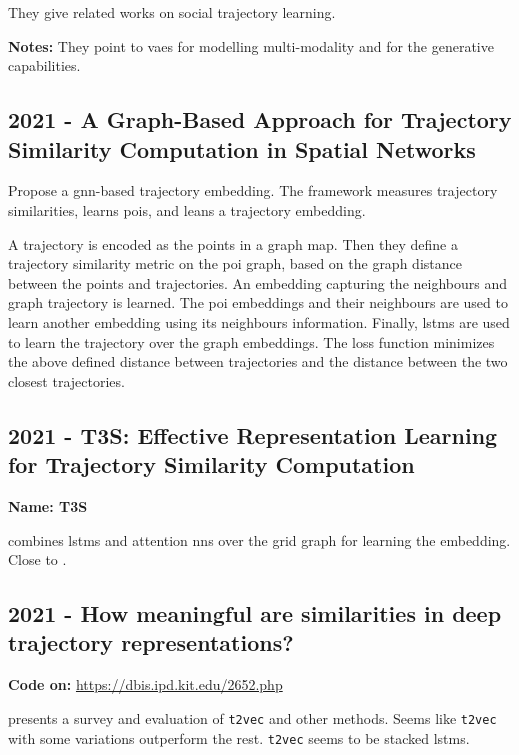They give related works on social trajectory learning.

\textbf{Notes:} They point to \glspl{vae} for modelling multi-modality and for the generative capabilities. 

\subsection*{2021 - A Graph-Based Approach for Trajectory Similarity Computation in Spatial Networks}

\cite{han2021graph} Propose a \gls{gnn}-based trajectory embedding. The framework measures trajectory similarities, learns \glspl{poi}, and leans a trajectory embedding.

A trajectory is encoded as the points in a graph map. Then they define a trajectory similarity metric on the \gls{poi} graph, based on the graph distance between the points and trajectories. An embedding capturing the neighbours and graph trajectory is learned. The \gls{poi} embeddings and their neighbours are used to learn another embedding using its neighbours information. Finally, \glspl{lstm} are used to learn the trajectory over the graph embeddings. The loss function minimizes the above defined distance between trajectories and the distance between the two closest trajectories.

\subsection*{2021 - T3S: Effective Representation Learning for Trajectory Similarity Computation}

\textbf{Name: T3S}

\cite{yang2021t3s} combines \glspl{lstm} and attention \glspl{nn} over the grid graph for learning the embedding. Close to \cite{yao2019computing, zhang2020trajectory, chen2021embedding}.

\subsection*{2021 - How meaningful are similarities in deep trajectory representations?}

\textbf{Code on:} \url{https://dbis.ipd.kit.edu/2652.php}

\cite{taghizadeh2021meaningful} presents a survey and evaluation of \texttt{t2vec} \cite{li2018deep} and other methods. Seems like \texttt{t2vec} with some variations outperform the rest. \texttt{t2vec} seems to be stacked \glspl{lstm}.

